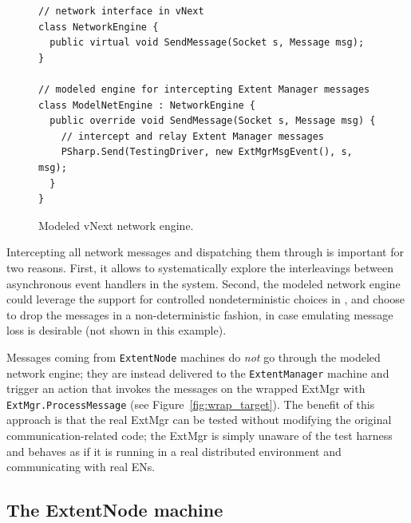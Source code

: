 \begin{figure}[t]
\begin{lstlisting}
// network interface in vNext
class NetworkEngine {
  public virtual void SendMessage(Socket s, Message msg);
}

// modeled engine for intercepting Extent Manager messages
class ModelNetEngine : NetworkEngine {
  public override void SendMessage(Socket s, Message msg) {
    // intercept and relay Extent Manager messages
    PSharp.Send(TestingDriver, new ExtMgrMsgEvent(), s, msg);
  }
}
\end{lstlisting}
\vspace{-4mm}
\caption{Modeled vNext network engine.}
\label{fig:enginecode}
\vspace{-2mm}
\end{figure}

Intercepting all network messages and dispatching them through \psharp is important for two reasons. First, it allows \psharp to systematically explore the interleavings between asynchronous event handlers in the system. Second, the modeled network engine could leverage the support for controlled nondeterministic choices in \psharp, and choose to drop the messages in a non-deterministic fashion, in case emulating message loss is desirable (not shown in this example).

Messages coming from \texttt{ExtentNode} machines do \emph{not} go through the modeled network engine; they are instead delivered to the \texttt{ExtentManager} machine and trigger an action that invokes the messages on the wrapped ExtMgr with \texttt{ExtMgr.ProcessMessage} (see Figure~\ref{fig:wrap_target}). The benefit of this approach is that the real ExtMgr can be tested without modifying the original communication-related code; the ExtMgr is simply unaware of the \psharp test harness and behaves as if it is running in a real distributed environment and communicating with real ENs.

\subsection{The ExtentNode machine}
\label{sec:method:model_en}

